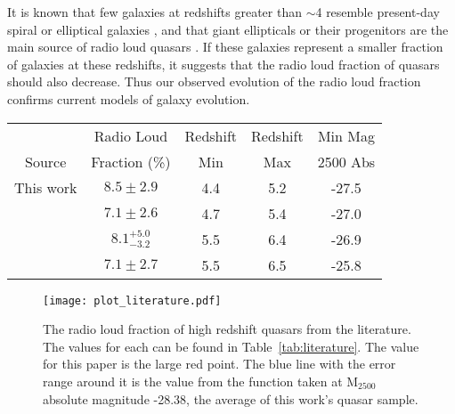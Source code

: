 \documentclass[a4paper,fleqn,usenatbib]{mnras}
\newcommand{\around}{$\sim$}
\begin{document}
{It is known that few galaxies at redshifts greater than \around 4 resemble present-day spiral or elliptical galaxies \citep{beckwith06}, and that  giant ellipticals or their progenitors are the main source of radio loud quasars \citep{floyd10,tadhunter16,rees16,rusinek20}.  If these galaxies represent a smaller fraction of galaxies at these redshifts, it suggests that the radio loud fraction of quasars should also decrease.   Thus our observed evolution of the radio loud fraction confirms current models of  galaxy evolution.}


\begin{table*}
\centering
\caption{{The radio loud fraction of high redshift quasars from the literature with their redshift ranges and the minimum absolute 2500 magnitudes of their sample.}}
\label{tab:literature}
\begin{tabular}{ccccc} 
\hline

\      & Radio Loud    & Redshift & Redshift    & Min Mag \\   
Source & Fraction (\%) & Min      & Max         & 2500 Abs \\

\hline
This work        & $8.5 \pm 2.9$ & 4.4 & 5.2 & -27.5 \\
\cite{yang16}    & $7.1 \pm 2.6$ & 4.7 & 5.4 & -27.0 \\
\cite{banados15} & $8.1^{+5.0}_{-3.2}$ & 5.5 & 6.4 & -26.9 \\
\cite{liu21}     & $7.1 \pm 2.7$ & 5.5 & 6.5 & -25.8 \\

\end{tabular}
\end{table*}



\begin{figure}
  \texttt{[image: plot\_literature.pdf]}
  \caption{{The radio loud fraction of high redshift quasars from the literature.  The values for each can be found in Table~\ref{tab:literature}.  The value for this paper is the large red point.  The blue line with the error range around it is the value from the \citet{jiang07} function taken at M$_{2500}$ absolute magnitude -28.38, the average of this work's quasar sample.}}
  \label{fig:plot_literature}
\end{figure}
\end{document}
